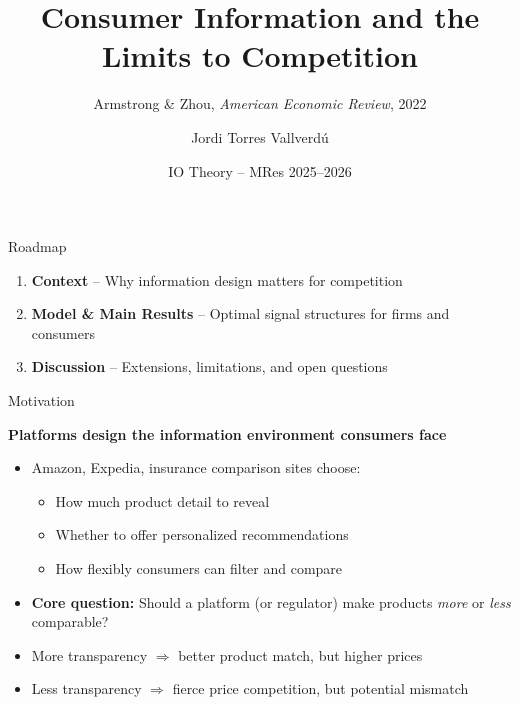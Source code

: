 \documentclass[aspectratio=169, 11pt]{beamer}
\title[Armstrong \& Zhou (2022)]{Consumer Information and the Limits to Competition}
\subtitle{Armstrong \& Zhou, \textit{American Economic Review}, 2022}
\author{Jordi Torres Vallverd\'{u}}
\institute{Toulouse School of Economics}
\date{IO Theory -- MRes 2025--2026}
\begin{document}
\begin{frame}
\titlepage
\end{frame}

\begin{frame}{Roadmap}

\begin{enumerate}
    \item \textbf{Context} -- Why information design matters for competition

    \bigskip

    \item \textbf{Model \& Main Results} -- Optimal signal structures for firms and consumers

    \bigskip

    \item \textbf{Discussion} -- Extensions, limitations, and open questions
\end{enumerate}

\end{frame}


\begin{frame}{Motivation}

\textbf{Platforms design the information environment consumers face}

\bigskip

\begin{itemize}
    \item Amazon, Expedia, insurance comparison sites choose:
    \begin{itemize}
        \item How much product detail to reveal
        \item Whether to offer personalized recommendations
        \item How flexibly consumers can filter and compare
    \end{itemize}

    \bigskip

    \item \textbf{Core question:} Should a platform (or regulator) make products \emph{more} or \emph{less} comparable?

    \bigskip

    \item More transparency $\Rightarrow$ better product match, but higher prices

    \item Less transparency $\Rightarrow$ fierce price competition, but potential mismatch
\end{itemize}

\end{frame}
\end{document}

